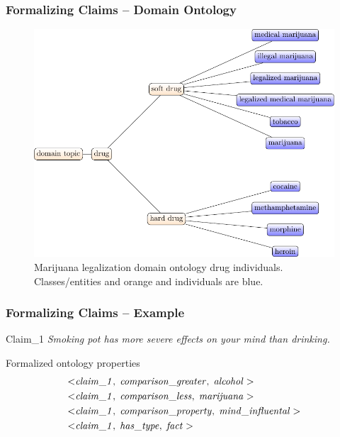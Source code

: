 \documentclass{beamer}
\begin{document}
\begin{frame}
	\frametitle{Formalizing Claims -- Domain Ontology}

\begin{figure}
	\includegraphics[scale=0.6]{../formalizations_drug_hierarchy-figure0.pdf}
\caption{Marijuana legalization domain ontology drug individuals. 
	Classes/entities and orange and individuals are blue. }
\end{figure}
\end{frame}

\begin{frame}
	\frametitle{Formalizing Claims -- Example}

	\begin{block}{Claim\_1}
\textit{Smoking pot has more severe effects on your mind than drinking.} 
\end{block}

Formalized ontology properties
\begin{align*}
	< & \mathit{claim\_1}, \hspace{0.1cm} \mathit{comparison\_greater}, \hspace{0.1cm}
	\mathit{alcohol} > \\
	< & \mathit{claim\_1}, \hspace{0.1cm} \mathit{comparison\_less}, \hspace{0.1cm}
	\mathit{marijuana} >  \\
	< & \mathit{claim\_1}, \hspace{0.1cm} \mathit{comparison\_property}, \hspace{0.1cm}
	\mathit{mind\_influental} >  \\
	< & \mathit{claim\_1}, \hspace{0.1cm} \mathit{has\_type}, \hspace{0.1cm}
	\mathit{fact} > 
\end{align*}
\end{frame}
\end{document}
